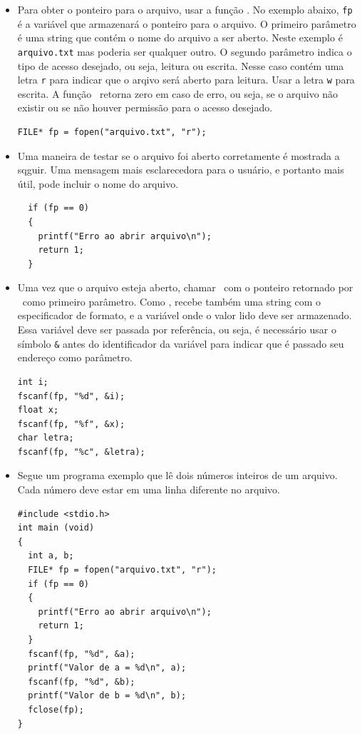 \begin{itemize}

\item Para obter o ponteiro para o arquivo, usar a função \FOPEN. No exemplo abaixo, {\tt fp} é a variável que armazenará o ponteiro para o arquivo. O primeiro parâmetro é uma string que contém o nome do arquivo a ser aberto. Neste exemplo é {\tt arquivo.txt} mas poderia ser qualquer outro. O segundo parâmetro indica o tipo de acesso desejado, ou seja, leitura ou escrita. Nesse caso contém uma letra {\tt r} para indicar que o arqivo será aberto para leitura. Usar a letra {\tt w} para escrita. A função \FOPEN\ retorna zero em caso de erro, ou seja, se o arquivo não existir ou se não houver permissão para o acesso desejado.

\begin{lstlisting}
FILE* fp = fopen("arquivo.txt", "r");
\end{lstlisting}

\item Uma maneira de testar se o arquivo foi aberto corretamente é mostrada a sqguir. Uma mensagem mais esclarecedora para o usuário, e portanto mais útil, pode incluir o nome do arquivo.

\begin{lstlisting}
  if (fp == 0)
  {
    printf("Erro ao abrir arquivo\n");
    return 1;
  }
\end{lstlisting}

\item Uma vez que o arquivo esteja aberto, chamar \FSCANF\ com o ponteiro retornado por \FOPEN\ como primeiro parâmetro. Como \SCANF, recebe também uma string com o especificador de formato, e a variável onde o valor lido deve ser armazenado. Essa variável deve ser passada por referência, ou seja, é necessário usar o símbolo {\tt \&} antes do identificador da variável para indicar que é passado seu endereço como parâmetro.

\begin{lstlisting}
int i;
fscanf(fp, "%d", &i);
float x;
fscanf(fp, "%f", &x);
char letra;
fscanf(fp, "%c", &letra);
\end{lstlisting}

\item Segue um programa exemplo que lê dois números inteiros de um arquivo. Cada número deve estar em uma linha diferente no arquivo.

\begin{lstlisting}
#include <stdio.h> 
int main (void)
{
  int a, b;
  FILE* fp = fopen("arquivo.txt", "r");
  if (fp == 0)
  {
    printf("Erro ao abrir arquivo\n");
    return 1;
  }
  fscanf(fp, "%d", &a);
  printf("Valor de a = %d\n", a);
  fscanf(fp, "%d", &b);
  printf("Valor de b = %d\n", b);
  fclose(fp);
}
\end{lstlisting}


\end{itemize}

